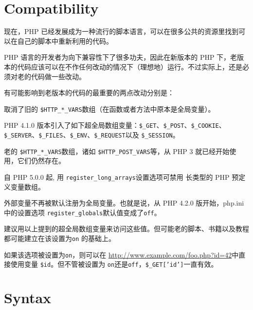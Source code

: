 \chapter{Compatibility}

现在，PHP 已经发展成为一种流行的脚本语言，可以在很多公共的资源里找到可以在自己的脚本中重新利用的代码。

PHP 语言的开发者为向下兼容性下了很多功夫，因此在新版本的 PHP 下，老版本的代码应该可以在不作任何改动的情况下（理想地）运行。不过实际上，还是必须对老的代码做一些改动。

有可能影响到老版本的代码的最重要的两点改动分别是：

\begin{compactitem}
\item 取消了旧的 \texttt{\$HTTP\_*\_VARS}数组（在函数或者方法中原本是全局变量）。

\end{compactitem}

PHP 4.1.0 版本引入了如下超全局数组变量：\texttt{\$\_GET}、\texttt{\$\_POST}、\texttt{\$\_COOKIE}、\texttt{\$\_SERVER}、\texttt{\$\_FILES}、\texttt{\$\_ENV}、\texttt{\$\_REQUEST}以及 \texttt{\$\_SESSION}。

老的 \texttt{\$HTTP\_*\_VARS}数组，诸如 \texttt{\$HTTP\_POST\_VARS}等，从 PHP 3 就已经开始使用，它们仍然存在。


自 PHP 5.0.0 起, 用 \texttt{register\_long\_arrays}设置选项可禁用 长类型的 PHP 预定义变量数组。


\begin{compactitem}
\item 外部变量不再被默认注册为全局变量。也就是说，从 PHP 4.2.0 版开始，php.ini 中的设置选项 \texttt{register\_globals}默认值变成了\texttt{off}。

\end{compactitem}

建议用以上提到的超全局数组变量来访问这些值。但可能老的脚本、书籍以及教程都可能建立在该设置为\texttt{on} 的基础上。

如果该选项被设置为\texttt{on}，则可以在 \url{http://www.example.com/foo.php?id=42}中直接使用变量 \texttt{\$id}。但不管被设置为 \texttt{on}还是\texttt{off}，\texttt{\$\_GET['id']}一直有效。







\chapter{Syntax}


